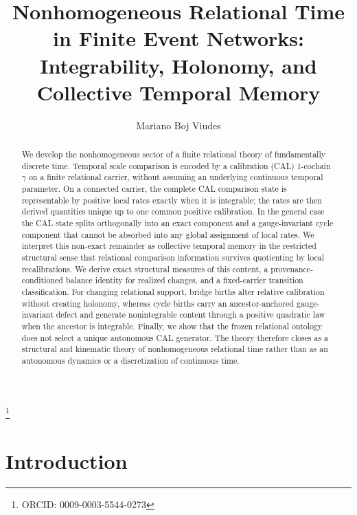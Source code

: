 \documentclass[aip,jmp,amsmath,amssymb,reprint]{revtex4-2}
\begin{document}
\title{Nonhomogeneous Relational Time in Finite Event Networks: Integrability, Holonomy, and Collective Temporal Memory}

\author{Mariano Boj Viudes}
\thanks{ORCID: 0009-0003-5544-0273}

\begin{abstract}
We develop the nonhomogeneous sector of a finite relational theory of fundamentally discrete time. Temporal scale comparison is encoded by a calibration (CAL) 1-cochain $\gamma$ on a finite relational carrier, without assuming an underlying continuous temporal parameter. On a connected carrier, the complete CAL comparison state is representable by positive local rates exactly when it is integrable; the rates are then derived quantities unique up to one common positive calibration. In the general case the CAL state splits orthogonally into an exact component and a gauge-invariant cycle component that cannot be absorbed into any global assignment of local rates. We interpret this non-exact remainder as collective temporal memory in the restricted structural sense that relational comparison information survives quotienting by local recalibrations. We derive exact structural measures of this content, a provenance-conditioned balance identity for realized changes, and a fixed-carrier transition classification. For changing relational support, bridge births alter relative calibration without creating holonomy, whereas cycle births carry an ancestor-anchored gauge-invariant defect and generate nonintegrable content through a positive quadratic law when the ancestor is integrable. Finally, we show that the frozen relational ontology does not select a unique autonomous CAL generator. The theory therefore closes as a structural and kinematic theory of nonhomogeneous relational time rather than as an autonomous dynamics or a discretization of continuous time.
\end{abstract}


\maketitle

\section{Introduction}\label{sec:introduction}
\end{document}
